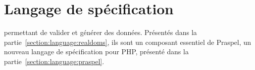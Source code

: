 \chapter{Langage de spécification}
\label{chapter:language}

\mminitoc

 permettant de valider et générer des données. Présentés
dans la partie~\ref{section:language:realdoms}, ils sont un composant essentiel
de Praspel, un nouveau langage de spécification pour PHP, présenté dans la
partie~\ref{section:language:praspel}.

